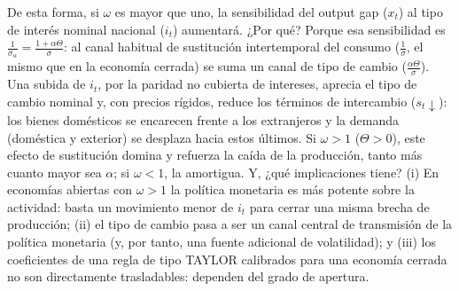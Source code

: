 \documentclass[10pt,a4paper]{article}
\begin{document}
De esta forma, si $\omega$ es mayor que uno, la sensibilidad del output gap ($x_t$) al tipo de interés nominal nacional ($i_t$) aumentará. ¿Por qué? Porque esa sensibilidad es $\frac{1}{\sigma_\alpha}=\frac{1+\alpha\Theta}{\sigma}$: al canal habitual de sustitución intertemporal del consumo ($\frac{1}{\sigma}$, el mismo que en la economía cerrada) se suma un canal de tipo de cambio ($\frac{\alpha\Theta}{\sigma}$). Una subida de $i_t$, por la paridad no cubierta de intereses, aprecia el tipo de cambio nominal y, con precios rígidos, reduce los términos de intercambio ($s_t\downarrow$): los bienes domésticos se encarecen frente a los extranjeros y la demanda (doméstica y exterior) se desplaza hacia estos últimos. Si $\omega>1$ ($\Theta>0$), este efecto de sustitución domina y refuerza la caída de la producción, tanto más cuanto mayor sea $\alpha$; si $\omega<1$, la amortigua. Y, ¿qué implicaciones tiene? (i) En economías abiertas con $\omega>1$ la política monetaria es más potente sobre la actividad: basta un movimiento menor de $i_t$ para cerrar una misma brecha de producción; (ii) el tipo de cambio pasa a ser un canal central de transmisión de la política monetaria (y, por tanto, una fuente adicional de volatilidad); y (iii) los coeficientes de una regla de tipo TAYLOR calibrados para una economía cerrada no son directamente trasladables: dependen del grado de apertura.
\end{document}

